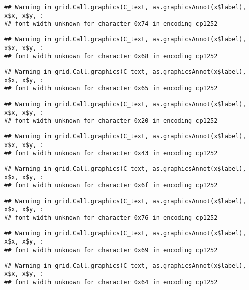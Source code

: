 \documentclass[
]{article}
\begin{document}
\begin{verbatim}
## Warning in grid.Call.graphics(C_text, as.graphicsAnnot(x$label), x$x, x$y, :
## font width unknown for character 0x74 in encoding cp1252
\end{verbatim}

\begin{verbatim}
## Warning in grid.Call.graphics(C_text, as.graphicsAnnot(x$label), x$x, x$y, :
## font width unknown for character 0x68 in encoding cp1252
\end{verbatim}

\begin{verbatim}
## Warning in grid.Call.graphics(C_text, as.graphicsAnnot(x$label), x$x, x$y, :
## font width unknown for character 0x65 in encoding cp1252
\end{verbatim}

\begin{verbatim}
## Warning in grid.Call.graphics(C_text, as.graphicsAnnot(x$label), x$x, x$y, :
## font width unknown for character 0x20 in encoding cp1252
\end{verbatim}

\begin{verbatim}
## Warning in grid.Call.graphics(C_text, as.graphicsAnnot(x$label), x$x, x$y, :
## font width unknown for character 0x43 in encoding cp1252
\end{verbatim}

\begin{verbatim}
## Warning in grid.Call.graphics(C_text, as.graphicsAnnot(x$label), x$x, x$y, :
## font width unknown for character 0x6f in encoding cp1252
\end{verbatim}

\begin{verbatim}
## Warning in grid.Call.graphics(C_text, as.graphicsAnnot(x$label), x$x, x$y, :
## font width unknown for character 0x76 in encoding cp1252
\end{verbatim}

\begin{verbatim}
## Warning in grid.Call.graphics(C_text, as.graphicsAnnot(x$label), x$x, x$y, :
## font width unknown for character 0x69 in encoding cp1252
\end{verbatim}

\begin{verbatim}
## Warning in grid.Call.graphics(C_text, as.graphicsAnnot(x$label), x$x, x$y, :
## font width unknown for character 0x64 in encoding cp1252
\end{verbatim}
\end{document}
